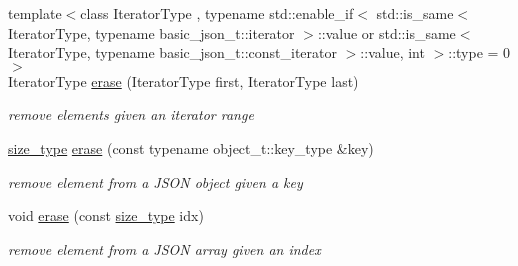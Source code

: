 \begin{DoxyCompactItemize}
{\footnotesize template$<$class Iterator\+Type , typename std\+::enable\+\_\+if$<$ std\+::is\+\_\+same$<$ Iterator\+Type, typename basic\+\_\+json\+\_\+t\+::iterator $>$\+::value or std\+::is\+\_\+same$<$ Iterator\+Type, typename basic\+\_\+json\+\_\+t\+::const\+\_\+iterator $>$\+::value, int $>$\+::type  = 0$>$ }\\Iterator\+Type \mbox{\hyperlink{classnlohmann_1_1basic__json_a4b3f7eb2d4625d95a51fbbdceb7c5f39}{erase}} (Iterator\+Type first, Iterator\+Type last)
\begin{DoxyCompactList}\small\item\em remove elements given an iterator range \end{DoxyCompactList}\item 
\mbox{\hyperlink{classnlohmann_1_1basic__json_a39f2cd0b58106097e0e67bf185cc519b}{size\+\_\+type}} \mbox{\hyperlink{classnlohmann_1_1basic__json_a2f8484d69c55d8f2a9697a7bec29362a}{erase}} (const typename object\+\_\+t\+::key\+\_\+type \&key)
\begin{DoxyCompactList}\small\item\em remove element from a J\+S\+ON object given a key \end{DoxyCompactList}\item 
void \mbox{\hyperlink{classnlohmann_1_1basic__json_a88cbcefe9a3f4d294bed0653550a5cb9}{erase}} (const \mbox{\hyperlink{classnlohmann_1_1basic__json_a39f2cd0b58106097e0e67bf185cc519b}{size\+\_\+type}} idx)
\begin{DoxyCompactList}\small\item\em remove element from a J\+S\+ON array given an index \end{DoxyCompactList}\end{DoxyCompactItemize}

